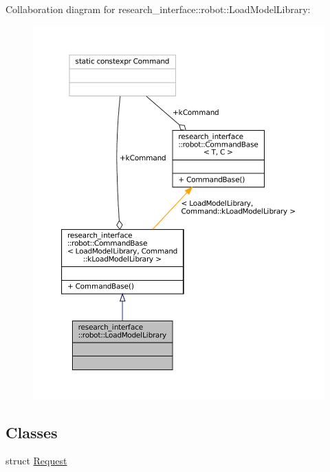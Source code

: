 Collaboration diagram for research\+\_\+interface\+:\+:robot\+:\+:Load\+Model\+Library\+:
\nopagebreak
\begin{figure}[H]
\begin{center}
\leavevmode
\includegraphics[width=350pt]{structresearch__interface_1_1robot_1_1LoadModelLibrary__coll__graph}
\end{center}
\end{figure}
\subsection*{Classes}
\begin{DoxyCompactItemize}
\item 
struct \hyperlink{structresearch__interface_1_1robot_1_1LoadModelLibrary_1_1Request}{Request}
\end{DoxyCompactItemize}
